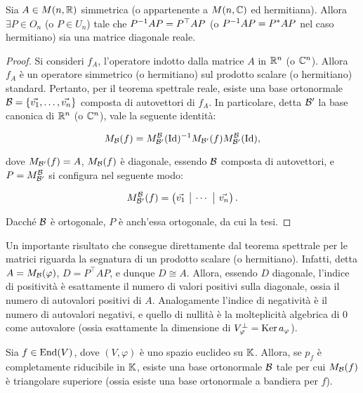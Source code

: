 \begin{corollary} 
	Sia $A \in M(n, \mathbb R)$ simmetrica (o appartenente a $M(n, \mathbb C)$ ed hermitiana). Allora
	$\exists P \in O_n$ (o $P \in U_n$) tale che $P^{-1} A P = P^\top A P$ (o $P^{-1} A P = P^* A P$ nel caso hermitiano)
	sia una matrice diagonale reale.
\end{corollary}

\begin{proof}
	Si consideri $f_A$, l'operatore indotto dalla matrice $A$ in $\mathbb R^n$ (o $\mathbb C^n$). Allora
	$f_A$ è un operatore simmetrico (o hermitiano) sul prodotto scalare (o hermitiano) standard.
	Pertanto, per il teorema spettrale reale, esiste una base ortonormale $\basis = \{ \vv 1, \ldots, \vv n\}$ composta di autovettori
	di $f_A$. In particolare, detta $\mathcal{B}'$ la base canonica di $\mathbb R^n$ (o $\mathbb C^n$), vale
	la seguente identità:
	
	\[ M_{\mathcal{B}}(f) = M_{\mathcal{B}'}^{\mathcal{B}}(\mathrm{Id})^{-1} M_{\mathcal{B}'}(f) M_{\mathcal{B}'}^{\mathcal{B}}(\mathrm{Id}), \]
	
	dove $M_{\mathcal{B}'}(f) = A$, $M_{\mathcal{B}}(f)$ è diagonale, essendo $\mathcal{B}$ composta di autovettori, e $P = M_{\mathcal{B}'}^{\mathcal{B}}$
	si configura nel seguente modo:
	
	\[ M_{\basis'}^{\basis}(f) = \Matrix{ \vv 1 & \rvline & \cdots & \rvline & \vv n }. \]
	
	Dacché $\mathcal{B}$ è ortogonale, $P$ è anch'essa ortogonale, da cui la tesi.
\end{proof}

\begin{remark}\nl
	\li Un importante risultato che consegue direttamente dal teorema spettrale per le matrici riguarda
	la segnatura di un prodotto scalare (o hermitiano). Infatti, detta $A = M_{\mathcal{B}}(\varphi)$,
	$D = P^\top A P$, e dunque $D \cong A$. Allora, essendo $D$ diagonale, l'indice di positività
	è esattamente il numero di valori positivi sulla diagonale, ossia il numero di autovalori
	positivi di $A$. Analogamente l'indice di negatività è il numero di autovalori negativi,
	e quello di nullità è la molteplicità algebrica di $0$ come autovalore (ossia esattamente
	la dimensione di $V^\perp_\varphi = \operatorname{Ker} a_\varphi$).
\end{remark}

\begin{theorem} 
	Sia $f \in \operatorname{End}(V)$, dove $(V, \varphi)$ è uno spazio euclideo su $\mathbb{K}$. Allora,
	se $p_f$ è completamente riducibile in $\mathbb{K}$, esiste una base ortonormale $\mathcal{B}$
	tale per cui $M_{\mathcal{B}}(f)$ è triangolare superiore (ossia esiste una base ortonormale
	a bandiera per $f$).
\end{theorem}

